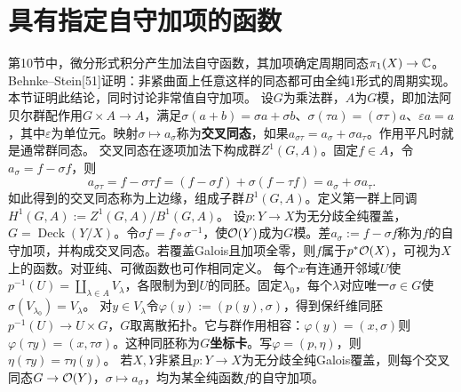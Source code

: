 \section{具有指定自守加项的函数}
第10节中，微分形式积分产生加法自守函数，其加项确定周期同态$\pi_1(X)\to\mathbb C$。Behnke--Stein[51]证明：非紧曲面上任意这样的同态都可由全纯1形式的周期实现。本节证明此结论，同时讨论非常值自守加项。
设$G$为乘法群，$A$为$G$模，即加法阿贝尔群配作用$G\times A\to A$，满足$\sigma(a+b)=\sigma a+\sigma b$、$\sigma(\tau a)=(\sigma\tau)a$、$\varepsilon a=a$，其中$\varepsilon$为单位元。映射$\sigma\mapsto a_\sigma$称为\textbf{交叉同态}，如果$a_{\sigma\tau}=a_\sigma+\sigma a_\tau$。作用平凡时就是通常群同态。
交叉同态在逐项加法下构成群$Z^1(G,A)$。固定$f\in A$，令$a_\sigma=f-\sigma f$，则
\[
a_{\sigma\tau}=f-\sigma\tau f=(f-\sigma f)+\sigma(f-\tau f)=a_\sigma+\sigma a_\tau.
\]
如此得到的交叉同态称为上边缘，组成子群$B^1(G,A)$。定义第一群上同调$H^1(G,A):=Z^1(G,A)/B^1(G,A)$。
设$p:Y\to X$为无分歧全纯覆盖，$G=\operatorname{Deck}(Y/X)$。令$\sigma f=f\circ\sigma^{-1}$，使$\mathcal O(Y)$成为$G$模。差$a_\sigma:=f-\sigma f$称为$f$的自守加项，并构成交叉同态。若覆盖Galois且加项全零，则$f$属于$p^*\mathcal O(X)$，可视为$X$上的函数。对亚纯、可微函数也可作相同定义。
每个$x$有连通开邻域$U$使$p^{-1}(U)=\coprod_{\lambda\in A}V_\lambda$，各限制为到$U$的同胚。固定$\lambda_0$，每个$\lambda$对应唯一$\sigma\in G$使$\sigma(V_{\lambda_0})=V_\lambda$。
对$y\in V_\lambda$令$\varphi(y):=(p(y),\sigma)$，得到保纤维同胚$p^{-1}(U)\to U\times G$，$G$取离散拓扑。它与群作用相容：$\varphi(y)=(x,\sigma)$则$\varphi(\tau y)=(x,\tau\sigma)$。这种同胚称为\textbf{$G$坐标卡}。写$\varphi=(p,\eta)$，则$\eta(\tau y)=\tau\eta(y)$。
若$X,Y$非紧且$p:Y\to X$为无分歧全纯Galois覆盖，则每个交叉同态$G\to\mathcal O(Y)$，$\sigma\mapsto a_\sigma$，均为某全纯函数$f$的自守加项。

